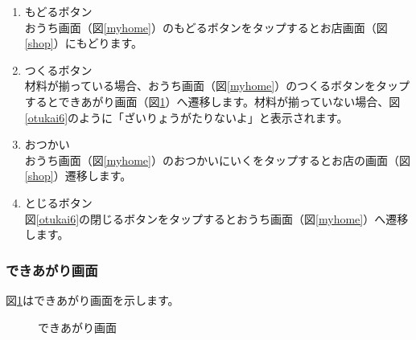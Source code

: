 \documentclass[a4j]{jarticle}
\begin{document}
\begin{enumerate}
  \renewcommand{\labelenumi}{\textcircled{\scriptsize \theenumi}}
\item もどるボタン\\
  おうち画面（図\ref{myhome}）のもどるボタンをタップするとお店画面（図\ref{shop}）にもどります。
\item つくるボタン\\
  材料が揃っている場合、おうち画面（図\ref{myhome}）のつくるボタンをタップするとできあがり画面（図\ref{completion}）へ遷移します。材料が揃っていない場合、図\ref{otukai6}のように「ざいりょうがたりないよ」と表示されます。
\item おつかい\\
  おうち画面（図\ref{myhome}）のおつかいにいくをタップするとお店の画面（図\ref{shop}）遷移します。
\item とじるボタン\\
  図\ref{otukai6}の閉じるボタンをタップするとおうち画面（図\ref{myhome}）へ遷移します。
\end{enumerate}

\newpage
\subsubsection{できあがり画面}
図\ref{completion}はできあがり画面を示します。\\

\begin{figure}[H]
    \begin{center}
    \caption {できあがり画面}
    \label{completion}
    \end{center}
\end{figure}
\end{document}
